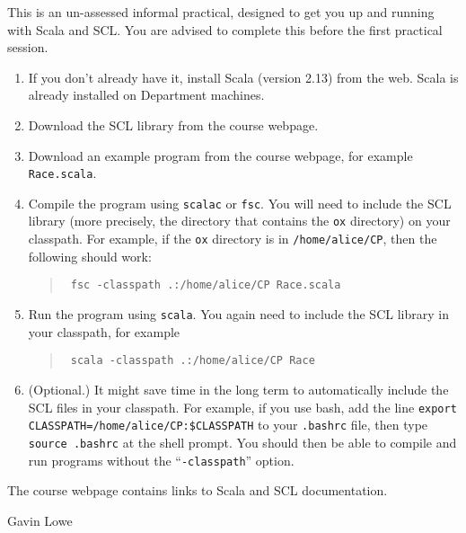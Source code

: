 \documentclass[12pt,a4paper]{article}
\begin{document}
This is an un-assessed informal practical, designed to get you up and running
with Scala and SCL\@.  You are advised to complete this before the first
practical session. 
%
\begin{enumerate}
\item If you don't already have it, install Scala (version 2.13) from the web.
  Scala is already installed on Department machines.

\item Download the SCL library from the course webpage.

\item Download an example program from the course webpage,
  for example \texttt{Race.scala}. 

\item Compile the program using \texttt{scalac} or \texttt{fsc}.  You will
  need to include the SCL library (more precisely, the directory that contains
  the \texttt{ox} directory) on your classpath.  For example, if the
  \texttt{ox} directory is in \texttt{/home/alice/CP}, then the following
  should work: 
  \begin{quote}\tt
  fsc -classpath .:/home/alice/CP Race.scala
  \end{quote}

\item Run the program using \texttt{scala}.  You again need to include the SCL
  library in your classpath, for example
  \begin{quote}\tt  
  scala -classpath .:/home/alice/CP Race
  \end{quote}

\item (Optional.)  It might save time in the long term to automatically
  include the SCL files in your classpath.  For example, if you use bash, add
  the line \texttt{export CLASSPATH=/home/alice/CP:\$CLASSPATH} to your
  \texttt{.bashrc} file, then type {\tt source .bashrc} at the shell prompt.
  You should then be able to compile and run programs without the
  ``\texttt{-classpath}'' option.
\end{enumerate}

The course webpage contains links to Scala and SCL documentation.

\begin{flushright}
Gavin Lowe
\end{flushright}
\end{document}
